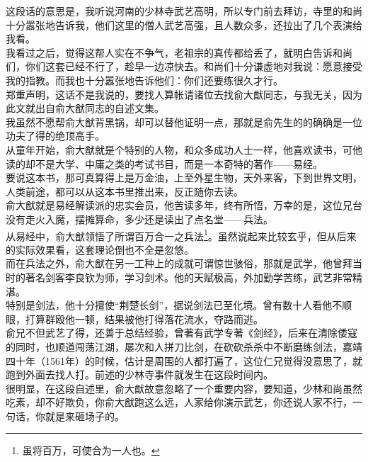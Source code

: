 \begin{multicols}{\theparacolNo}
这段话的意思是，我听说河南的少林寺武艺高明，所以专门前去拜访，寺里的和尚十分嚣张地告诉我，他们这里的僧人武艺高强，且人数众多，还拉出了几个表演给我看。\\

我看过之后，觉得这帮人实在不争气，老祖宗的真传都给丢了，就明白告诉和尚们，你们这套已经不行了，趁早一边凉快去。和尚们十分谦虚地对我说：愿意接受我的指教。而我也十分嚣张地告诉他们：你们还要练很久才行。\\

郑重声明，这话不是我说的，要找人算帐请诸位去找俞大猷同志，与我无关，因为此文就出自俞大猷同志的自述文集。\\

我虽然不愿帮俞大猷背黑锅，却可以替他证明一点，那就是俞先生的的确确是一位功夫了得的绝顶高手。\\

从童年开始，俞大猷就是个特别的人物，和众多成功人士一样，他喜欢读书，可他读的却不是大学、中庸之类的考试书目，而是一本奇特的著作——易经。\\

要说这本书，那可真算得上是万金油，上至外星生物，天外来客，下到世界文明，人类前途，都可以从这本书里推出来，反正随你去读。\\

俞大猷就是易经解读派的忠实会员，他苦读多年，终有所悟，万幸的是，这位兄台没有走火入魔，摆摊算命，多少还是读出了点名堂——兵法。\\

从易经中，俞大猷领悟了所谓百万合一之兵法\footnote{虽将百万，可使合为一人也。}。虽然说起来比较玄乎，但从后来的实际效果看，这套理论倒也不全是忽悠。\\

而在兵法之外，俞大猷在另一工种上的成就可谓惊世骇俗，那就是武学，他曾拜当时的著名剑客李良钦为师，学习剑术。他的天赋极高，外加勤学苦练，武艺非常精湛。\\

特别是剑法，他十分擅使“荆楚长剑”，据说剑法已至化境。曾有数十人看他不顺眼，打算群殴他一顿，结果被他打得落花流水，夺路而逃。\\

俞兄不但武艺了得，还善于总结经验，曾著有武学专著《剑经》，后来在清除倭寇的同时，也顺道闯荡江湖，屡次和人拼刀比剑，在砍砍杀杀中不断磨练剑法，嘉靖四十年（1561年）的时候，估计是周围的人都打遍了，这位仁兄觉得没意思了，就跑到外面去找人打。前述的少林寺事件就发生在这段时间内。\\

很明显，在这段自述里，俞大猷故意忽略了一个重要内容，要知道，少林和尚虽然吃素，却不好欺负，你俞大猷跑这么远，人家给你演示武艺，你还说人家不行，一句话，你就是来砸场子的。\\


\end{multicols}
